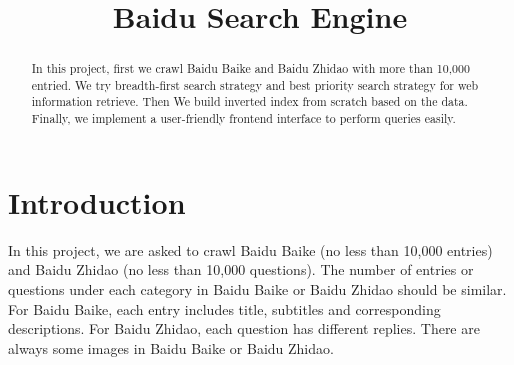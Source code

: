 \documentclass[10pt,times,twocolumn]{article}
\title{Baidu Search Engine}
\author{\anonymize{Chao Gao} \and
        \anonymize{Yinchu Wu} \and
        \anonymize{Peilin Wu}}
\begin{document}
\maketitle

\begin{abstract}
In this project, first we crawl Baidu Baike and Baidu Zhidao with more than 10,000 entried. We try breadth-first search strategy and best priority search strategy for web information retrieve.
Then We build inverted index from scratch based on the data. Finally, we implement a user-friendly 
frontend interface to perform queries easily. 
\end{abstract}


\section{Introduction}\label{sec:gen}
In this project, we are asked to crawl Baidu Baike (no less than 10,000 entries) and Baidu Zhidao (no less than 10,000 questions). The number of entries or questions under each category in Baidu Baike or Baidu Zhidao should be similar. For Baidu Baike, each entry includes title, subtitles and corresponding descriptions. For Baidu Zhidao, each question has different replies. There are always some images in Baidu Baike or Baidu Zhidao.
\end{document}
